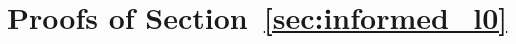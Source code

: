 \documentclass[aos]{imsart}
\theoremstyle{plain}
\newcommand{\M}{\mathcal{M}}
\newcommand{\bs}{\boldsymbol}
\begin{document}
\section{Proofs of Section~\ref{sec:informed_l0}}



\end{document}
